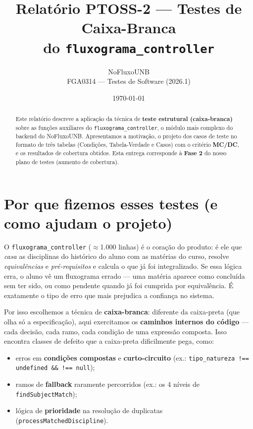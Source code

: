 \documentclass[11pt,a4paper]{article}
\title{\textbf{Relatório PTOSS-2 --- Testes de Caixa-Branca\\ do \texttt{fluxograma\_controller}}}
\author{NoFluxoUNB \\ \small FGA0314 --- Testes de Software (2026.1)}
\date{\today}
\begin{document}
\maketitle

\begin{abstract}
\noindent
Este relatório descreve a aplicação da técnica de \textbf{teste estrutural
(caixa-branca)} sobre as funções auxiliares do \texttt{fluxograma\_controller},
o módulo mais complexo do backend do NoFluxoUNB. Apresentamos a motivação, o
projeto dos casos de teste no formato de três tabelas (Condições,
Tabela-Verdade e Casos) com o critério \textbf{MC/DC}, e os resultados de
cobertura obtidos. Esta entrega corresponde à \textbf{Fase 2} do nosso plano de
testes (aumento de cobertura).
\end{abstract}

\tableofcontents
\bigskip

\section{Por que fizemos esses testes (e como ajudam o projeto)}

O \texttt{fluxograma\_controller} ($\approx$1.000 linhas) é o coração do produto:
é ele que \emph{casa} as disciplinas do histórico do aluno com as matérias do
curso, resolve \emph{equivalências} e \emph{pré-requisitos} e calcula o que já
foi integralizado. Se essa lógica erra, o aluno vê um fluxograma errado --- uma
matéria aparece como concluída sem ter sido, ou como pendente quando já foi
cumprida por equivalência. É exatamente o tipo de erro que mais prejudica a
confiança no sistema.

Por isso escolhemos a técnica de \textbf{caixa-branca}: diferente da caixa-preta
(que olha só a especificação), aqui exercitamos os \textbf{caminhos internos do
código} --- cada decisão, cada ramo, cada condição de uma expressão composta.
Isso encontra classes de defeito que a caixa-preta dificilmente pega, como:

\begin{itemize}[leftmargin=1.4em]
  \item erros em \textbf{condições compostas} e \textbf{curto-circuito}
        (ex.: \texttt{tipo\_natureza !== undefined \&\& !== null});
  \item ramos de \textbf{fallback} raramente percorridos
        (ex.: os 4 níveis de \texttt{findSubjectMatch});
  \item lógica de \textbf{prioridade} na resolução de duplicatas
        (\texttt{processMatchedDiscipline}).
\end{itemize}
\end{document}
